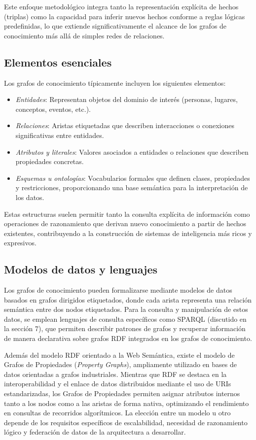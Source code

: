 \documentclass{article}
\begin{document}
Este enfoque metodológico integra tanto la representación explícita de hechos (triplas) como la capacidad para inferir nuevos hechos conforme a reglas lógicas predefinidas, lo que extiende significativamente el alcance de los grafos de conocimiento más allá de simples redes de relaciones.

\subsection{Elementos esenciales}

Los grafos de conocimiento típicamente incluyen los siguientes elementos:
\begin{itemize}
    \item \textit{Entidades}: Representan objetos del dominio de interés (personas, lugares, conceptos, eventos, etc.).
    \item \textit{Relaciones}: Aristas etiquetadas que describen interacciones o conexiones significativas entre entidades.
    \item \textit{Atributos y literales}: Valores asociados a entidades o relaciones que describen propiedades concretas.
    \item \textit{Esquemas u ontologías}: Vocabularios formales que definen clases, propiedades y restricciones, proporcionando una base semántica para la interpretación de los datos.
\end{itemize}

Estas estructuras suelen permitir tanto la consulta explícita de información como operaciones de razonamiento que derivan nuevo conocimiento a partir de hechos existentes, contribuyendo a la construcción de sistemas de inteligencia más ricos y expresivos.

\subsection{Modelos de datos y lenguajes}

Los grafos de conocimiento pueden formalizarse mediante modelos de datos basados en grafos dirigidos etiquetados, donde cada arista representa una relación semántica entre dos nodos etiquetados. Para la consulta y manipulación de estos datos, se emplean lenguajes de consulta específicos como SPARQL (discutido en la sección 7), que permiten describir patrones de grafos y recuperar información de manera declarativa sobre grafos RDF integrados en los grafos de conocimiento.

Además del modelo RDF orientado a la Web Semántica, existe el modelo de Grafos de Propiedades (\textit{Property Graphs}), ampliamente utilizado en bases de datos orientadas a grafos industriales. Mientras que RDF se destaca en la interoperabilidad y el enlace de datos distribuidos mediante el uso de URIs estandarizadas, los Grafos de Propiedades permiten asignar atributos internos tanto a los nodos como a las aristas de forma nativa, optimizando el rendimiento en consultas de recorridos algorítmicos. La elección entre un modelo u otro depende de los requisitos específicos de escalabilidad, necesidad de razonamiento lógico y federación de datos de la arquitectura a desarrollar.
\end{document}

